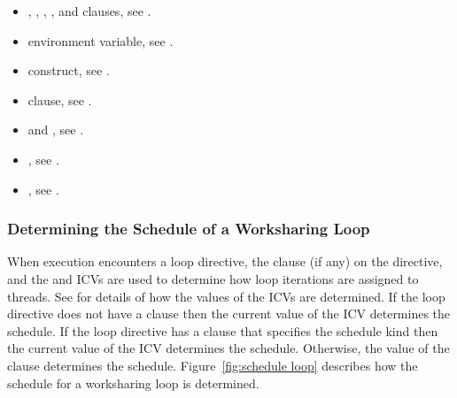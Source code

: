 \crossreferences
\begin{itemize}
\item {}, , , , and  clauses, see 
.

\item {} environment variable, see 
.

\item {} construct, see 
.

\item {} clause, see
.

\item {} and , see
  .
\item {}, see .

\item {}, see 
.

\end{itemize}








\subsubsection{Determining the Schedule of a Worksharing Loop}
\label{subsubsec:Determining the Schedule of a Worksharing Loop}
When execution encounters a loop directive, the  clause (if any) on the 
directive, and the  and  ICVs are used to determine how loop 
iterations are assigned to threads. See 
for details of how the 
values of the ICVs are determined. If the loop directive does not have a  
clause then the current value of the \mbox{} ICV determines the schedule. If the 
loop directive has a  clause that specifies the  schedule kind then 
the current value of the  ICV determines the schedule. Otherwise, the 
value of the  clause determines the schedule. Figure~\ref{fig:schedule loop}
describes how the schedule for a worksharing loop is determined.

